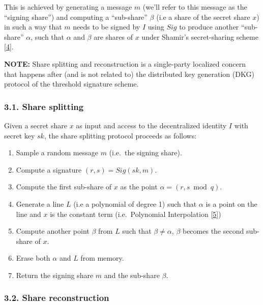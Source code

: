 \documentclass[
]{article}
\providecommand{\tightlist}{%
  \setlength{\itemsep}{0pt}\setlength{\parskip}{0pt}}
\begin{document}
This is achieved by generating a message \(m\) (we'll refer to this
message as the ``signing share'') and computing a ``sub-share''
\(\beta\) (i.e a share of the secret share \(x\)) in such a way that
\(m\) needs to be signed by \(I\) using \(Sig\) to produce another
``sub-share'' \(\alpha\), such that \(\alpha\) and \(\beta\) are shares
of \(x\) under Shamir's secret-sharing scheme
{[}\protect\hyperlink{ref-sss79}{4}{]}.

\textbf{NOTE:} Share splitting and reconstruction is a single-party
localized concern that happens after (and is not related to) the
distributed key generation (DKG) protocol of the threshold signature
scheme.

\hypertarget{share-splitting}{%
\subsubsection{3.1. Share splitting}\label{share-splitting}}

Given a secret share \(x\) as input and access to the decentralized
identity \(I\) with secret key \(sk\), the share splitting protocol
proceeds as follows:

\begin{enumerate}
\def\labelenumi{\arabic{enumi}.}
\tightlist
\item
  Sample a random message \(m\) (i.e.~the signing share).
\item
  Compute a signature \((r, s) = Sig(sk, m)\).
\item
  Compute the first sub-share of \(x\) as the point
  \(\alpha = (r, s \bmod q)\).
\item
  Generate a line \(L\) (i.e a polynomial of degree 1) such that
  \(\alpha\) is a point on the line and \(x\) is the constant term
  (i.e.~Polynomial Interpolation
  {[}\protect\hyperlink{ref-wiki:interpolation}{5}{]})
\item
  Compute another point \(\beta\) from \(L\) such that
  \(\beta \neq \alpha\), \(\beta\) becomes the second sub-share of
  \(x\).
\item
  Erase both \(\alpha\) and \(L\) from memory.
\item
  Return the signing share \(m\) and the sub-share \(\beta\).
\end{enumerate}

\hypertarget{share-reconstruction}{%
\subsubsection{3.2. Share reconstruction}\label{share-reconstruction}}
\end{document}
